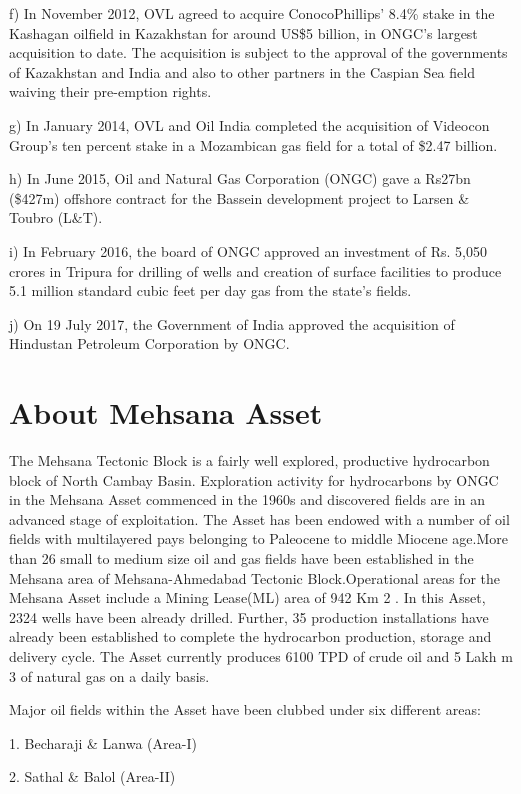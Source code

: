 \documentclass[11pt,a4paper]{article}
\begin{document}
f) In November 2012, OVL agreed to acquire ConocoPhillips' 8.4\% stake in the Kashagan oilfield in Kazakhstan for around US\$5 billion, in ONGC's largest acquisition to date. The acquisition is subject to the approval of the governments of Kazakhstan and India and also to other partners in the Caspian Sea field waiving their pre-emption rights.

g) In January 2014, OVL and Oil India completed the acquisition of Videocon Group's ten percent stake in a Mozambican gas field for a total of \$2.47 billion.

h) In June 2015, Oil and Natural Gas Corporation (ONGC) gave a Rs27bn (\$427m) offshore contract for the Bassein development project to Larsen \& Toubro (L\&T).

i) In February 2016, the board of ONGC approved an investment of Rs. 5,050 crores in Tripura for drilling of wells and creation of surface facilities to produce 5.1 million standard cubic feet per day gas from the state's fields.

j) On 19 July 2017, the Government of India approved the acquisition of Hindustan Petroleum Corporation by ONGC.

\section{About Mehsana Asset}

The Mehsana Tectonic Block is a fairly well explored, productive hydrocarbon block of North Cambay Basin. Exploration activity for hydrocarbons by ONGC in the Mehsana Asset commenced in the 1960s and discovered fields are in an advanced stage of exploitation. The Asset has been endowed with a number of oil fields with multilayered pays belonging to Paleocene to middle Miocene age.More than 26 small to medium size oil and gas fields have been established in the Mehsana area of Mehsana-Ahmedabad Tectonic Block.Operational areas for the Mehsana Asset include a Mining Lease(ML) area of 942 Km 2 . In this Asset, 2324 wells have been already
drilled. Further, 35 production installations have already been established to complete the hydrocarbon production, storage and delivery cycle. The Asset currently produces 6100 TPD of crude oil and 5 Lakh m 3 of natural gas on a daily basis.

Major oil fields within the Asset have been clubbed under six different areas:

1. Becharaji \& Lanwa (Area-I)

2. Sathal \& Balol (Area-II)
\end{document}
